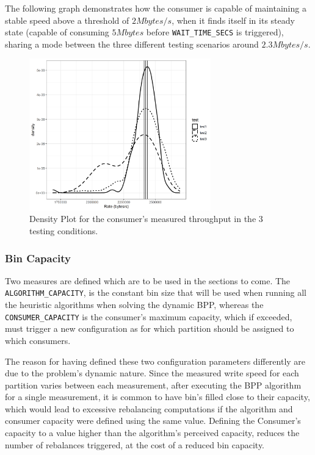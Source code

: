 The following graph demonstrates how the consumer is capable of maintaining a
stable speed above a threshold of $2 Mbytes/s$, when it finds itself in its
steady state (capable of consuming $5 Mbytes$ before
\lstinline[language=Python]{WAIT_TIME_SECS} is triggered), sharing a mode
between the three different testing scenarios around $2.3 Mbytes/s$.

\begin{figure}[H] \centering
\includegraphics[width=0.7\textwidth]{images/consumer/density.png}
\caption{
    Density Plot for the consumer's measured throughput in the 3 testing
    conditions.
} 
\label{fig:consumer_capacity} 
\end{figure}

\subsubsection{Bin Capacity} \label{result:bin capacity}

Two measures are defined which are to be used in the sections to come. The
\lstinline[language=Python]{ALGORITHM_CAPACITY}, is the constant bin size that
will be used when running all the heuristic algorithms when solving the dynamic
BPP, whereas the \lstinline[language=Python]{CONSUMER_CAPACITY} is the
consumer's maximum capacity, which if exceeded, must trigger a new configuration
as for which partition should be assigned to which consumers.

The reason for having defined these two configuration parameters differently are
due to the problem's dynamic nature. Since the measured write speed for each
partition varies between each measurement, after executing the BPP algorithm for
a single measurement, it is common to have bin's filled close to their capacity,
which would lead to excessive rebalancing computations if the algorithm and
consumer capacity were defined using the same value. Defining the Consumer's
capacity to a value higher than the algorithm's perceived capacity, reduces the
number of rebalances triggered, at the cost of a reduced bin capacity. 

